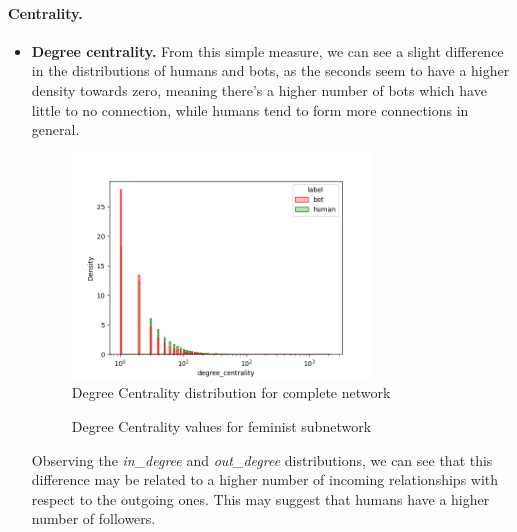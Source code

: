 \documentclass[12pt, a4paper]{article}
\begin{document}
    	\paragraph{Centrality.}
		\begin{itemize}
			\item \textbf{Degree centrality.} From this simple measure, we can see a slight difference in the distributions of humans and bots, as the seconds seem to have a higher density towards zero, meaning there's a higher number of bots which have little to no connection, while humans tend to form more connections in general.
                \begin{figure}[H]
                	\centering
                    \includegraphics[width=0.75\textwidth]{results/complete_degree_centrality.png}
                    \caption{Degree Centrality distribution for complete network}
                \end{figure}
				\begin{figure}[H]
    				\centering
    				\setlength{\fboxsep}{0pt}
    				\setlength{\fboxrule}{0.5pt}
    				\caption{Degree Centrality values for feminist subnetwork}
				\end{figure}
                Observing the \textit{in\_degree} and \textit{out\_degree} distributions, we can see that this difference may be related to a higher number of incoming relationships with respect to the outgoing ones. This may suggest that humans have a higher number of followers.

\end{itemize}
\end{document}
